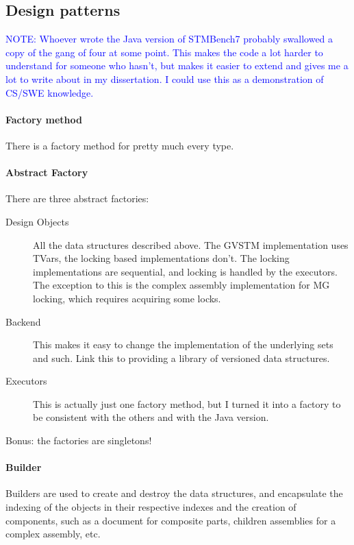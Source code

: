 \documentclass[12pt,a4paper,oneside,openright]{report}
\newcommand{\note}[1]{\textcolor{blue}{NOTE: #1}}
\begin{document}
\subsection{Design patterns}
\label{sec:impl:design-patterns}

\note{Whoever wrote the Java version of STMBench7 probably swallowed a
  copy of the gang of four at some point. This makes the code a lot
  harder to understand for someone who hasn't, but makes it easier to
  extend and gives me a lot to write about in my dissertation. I could
  use this as a demonstration of CS/SWE knowledge.}

\paragraph{Factory method}
There is a factory method for pretty much every type.

\paragraph{Abstract Factory}
There are three abstract factories:

\begin{description}
\item[Design Objects] All the data structures described above. The
  GVSTM implementation uses TVars, the locking based implementations
  don't. The locking implementations are sequential, and locking is
  handled by the executors. The exception to this is the complex
  assembly implementation for MG locking, which requires acquiring
  some locks.
\item[Backend] This makes it easy to change the implementation of the
  underlying sets and such. Link this to providing a library of
  versioned data structures.
\item[Executors] This is actually just one factory method, but I
  turned it into a factory to be consistent with the others and with
  the Java version.
\end{description}

Bonus: the factories are singletons!

\paragraph{Builder}

Builders are used to create and destroy the data structures, and
encapsulate the indexing of the objects in their respective indexes
and the creation of components, such as a document for composite
parts, children assemblies for a complex assembly, etc.
\end{document}
